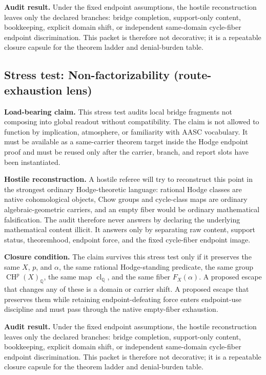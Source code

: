 \documentclass[11pt]{article}
\newcommand{\QQ}{\mathbb{Q}}
\newcommand{\CH}{\operatorname{CH}}
\newcommand{\clQ}{\operatorname{cl}_{\QQ}}
\begin{document}
\par\noindent\textbf{Audit result.} Under the fixed endpoint assumptions, the hostile reconstruction leaves only the declared branches: bridge completion, support-only content, bookkeeping, explicit domain shift, or independent same-domain cycle-fiber endpoint discrimination. This packet is therefore not decorative; it is a repeatable closure capsule for the theorem ladder and denial-burden table.


\subsection{Stress test: Non-factorizability (route-exhaustion lens)}

\par\noindent\textbf{Load-bearing claim.} This stress test audits local bridge fragments not composing into global readout without compatibility. The claim is not allowed to function by implication, atmosphere, or familiarity with AASC vocabulary. It must be available as a same-carrier theorem target inside the Hodge endpoint proof and must be reused only after the carrier, branch, and report slots have been instantiated.

\par\noindent\textbf{Hostile reconstruction.} A hostile referee will try to reconstruct this point in the strongest ordinary Hodge-theoretic language: rational Hodge classes are native cohomological objects, Chow groups and cycle-class maps are ordinary algebraic-geometric carriers, and an empty fiber would be ordinary mathematical falsification. The audit therefore never answers by declaring the underlying mathematical content illicit. It answers only by separating raw content, support status, theoremhood, endpoint force, and the fixed cycle-fiber endpoint image.

\par\noindent\textbf{Closure condition.} The claim survives this stress test only if it preserves the same $X$, $p$, and $\alpha$, the same rational Hodge-standing predicate, the same group $\CH^p(X)_\QQ$, the same map $\clQ$, and the same fiber $F_X(\alpha)$. A proposed escape that changes any of these is a domain or carrier shift. A proposed escape that preserves them while retaining endpoint-defeating force enters endpoint-use discipline and must pass through the native empty-fiber exhaustion.

\par\noindent\textbf{Audit result.} Under the fixed endpoint assumptions, the hostile reconstruction leaves only the declared branches: bridge completion, support-only content, bookkeeping, explicit domain shift, or independent same-domain cycle-fiber endpoint discrimination. This packet is therefore not decorative; it is a repeatable closure capsule for the theorem ladder and denial-burden table.
\end{document}
